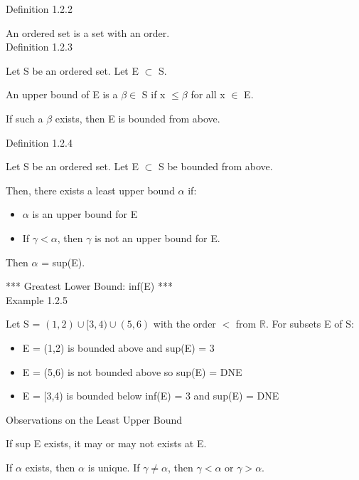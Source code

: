 { \color{blue} Definition 1.2.2 }

\qquad An ordered set is a set with an order. \\

{ \color{blue} Definition 1.2.3 }

\qquad Let S be an ordered set. Let E $ \subset $ S.

\qquad An upper bound of E is a $ \beta \in $ S if x $ \leq \beta $ for all x $ \in $ E.

\qquad If such a $ \beta $ exists, then E is bounded from above. \\

\newpage

{ \color{blue} Definition 1.2.4 }

\qquad Let S be an ordered set. Let E $ \subset $ S be bounded from above.

\qquad Then, there exists a least upper bound $ \alpha $ if:

\begin{itemize}[leftmargin=2cm]
	\item $ \alpha $ is an upper bound for E
	
	\item If $ \gamma < \alpha $, then $ \gamma $ is not an upper bound for E.
\end{itemize}

\qquad Then $ \alpha $ = sup(E).

*** Greatest Lower Bound: inf(E) *** \\

{ \color{purple} Example 1.2.5 }

\qquad Let S = $ (1,2) \cup [3,4) \cup (5,6) $ with the order $ < $ from $ \mathbb{R} $.
For subsets E of S:

\begin{itemize}[leftmargin=2cm]
	\item E = (1,2) is bounded above and sup(E) = 3
	
	\item E = (5,6) is not bounded above so sup(E) = DNE
	
	\item E = [3,4) is bounded below inf(E) = 3 and sup(E) = DNE
\end{itemize}

{ \color{green} Observations on the Least Upper Bound }

\qquad If sup E exists, it may or may not exists at E.

\qquad If $ \alpha $ exists, then $ \alpha $ is unique.
If $ \gamma \neq \alpha $, then $ \gamma < \alpha $ or $ \gamma > \alpha $. \\






